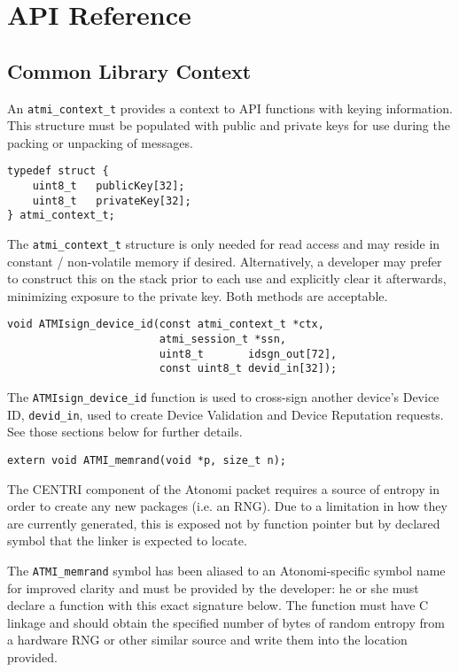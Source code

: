 \chapter{API Reference}

\section{Common Library Context}
An \texttt{atmi_context_t} provides a context to API functions with keying
information. This structure must be populated with public and private keys
for use during the packing or unpacking of messages.

\begin{lstlisting}[name=Context Structure]
typedef struct {
	uint8_t   publicKey[32];
	uint8_t   privateKey[32];
} atmi_context_t;
\end{lstlisting}

The \texttt{atmi_context_t} structure is only needed for read access and
may reside in constant / non-volatile memory if desired. Alternatively,
a developer may prefer to construct this on the stack prior to each use
and explicitly clear it afterwards, minimizing exposure to the private key.
Both methods are acceptable.

\begin{lstlisting}
void ATMIsign_device_id(const atmi_context_t *ctx,
                        atmi_session_t *ssn,
                        uint8_t       idsgn_out[72],
                        const uint8_t devid_in[32]);
\end{lstlisting}

The \texttt{ATMIsign_device_id} function is used to cross-sign another
device's Device ID, \texttt{devid_in}, used to create Device Validation and
Device Reputation requests. See those sections below for further details.


\begin{lstlisting}
extern void ATMI_memrand(void *p, size_t n);
\end{lstlisting}

The CENTRI component of the Atonomi packet requires a source of entropy
in order to create any new packages (i.e. an RNG). Due to a limitation in
how they are currently generated, this is exposed not by function pointer
but by declared symbol that the linker is expected to locate.

The \texttt{ATMI_memrand} symbol has been aliased to an Atonomi-specific
symbol name for improved clarity and must be provided by the developer:
he or she must declare a function with this exact signature below.
The function must have C linkage and should obtain the specified number of
bytes of random entropy from a hardware RNG or other similar source and write
them into the location provided.

